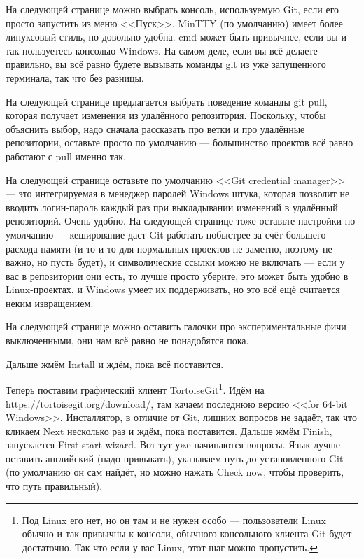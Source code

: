 \documentclass{../../text-style}
\begin{document}
На следующей странице можно выбрать консоль, используемую Git, если его просто запустить из меню <<Пуск>>. MinTTY (по умолчанию) имеет более линуксовый стиль, но довольно удобна. cmd может быть привычнее, если вы и так пользуетесь консолью Windows. На самом деле, если вы всё делаете правильно, вы всё равно будете вызывать команды git из уже запущенного терминала, так что без разницы.

На следующей странице предлагается выбрать поведение команды git pull, которая получает изменения из удалённого репозитория. Поскольку, чтобы объяснить выбор, надо сначала рассказать про ветки и про удалённые репозитории, оставьте просто по умолчанию --- большинство проектов всё равно работают с pull именно так.

На следующей странице оставьте по умолчанию <<Git credential manager>> --- это интегрируемая в менеджер паролей Windows штука, которая позволит не вводить логин-пароль каждый раз при выкладывании изменений в удалённый репозиторий. Очень удобно. На следующей странице тоже оставьте настройки по умолчанию --- кеширование даст Git работать побыстрее за счёт большего расхода памяти (и то и то для нормальных проектов не заметно, поэтому не важно, но пусть будет), и символические ссылки можно не включать --- если у вас в репозитории они есть, то лучше просто уберите, это может быть удобно в Linux-проектах, и Windows умеет их поддерживать, но это всё ещё считается неким извращением.

На следующей странице можно оставить галочки про экспериментальные фичи выключенными, они нам всё равно не понадобятся пока.

Дальше жмём Install и ждём, пока всё поставится.

Теперь поставим графический клиент TortoiseGit\footnote{Под Linux его нет, но он там и не нужен особо --- пользователи Linux обычно и так привычны к консоли, обычного консольного клиента Git будет достаточно. Так что если у вас Linux, этот шаг можно пропустить.}. Идём на \url{https://tortoisegit.org/download/}, там качаем последнюю версию <<for 64-bit Windows>>. Инсталлятор, в отличие от Git, лишних вопросов не задаёт, так что кликаем Next несколько раз и ждём, пока поставится. Дальше жмём Finish, запускается First start wizard. Вот тут уже начинаются вопросы. Язык лучше оставить английский (надо привыкать), указываем путь до установленного Git (по умолчанию он сам найдёт, но можно нажать Check now, чтобы проверить, что путь правильный). 
\end{document}
